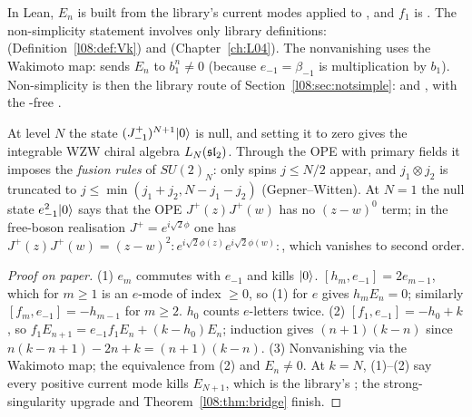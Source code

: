 \begin{dictionary}
In Lean, $E_n$ is built from the library's current modes  applied to
, and $f_1$ is . The non-simplicity statement involves only library definitions:
 (Definition~\ref{l08:def:Vk}) and  (Chapter~\ref{ch:L04}). The
nonvanishing uses the Wakimoto map:  sends $E_n$ to $b_1^n\ne0$ (because
$e_{-1} = \beta_{-1}$ is multiplication by $b_1$). Non-simplicity is then the library route of
Section~\ref{l08:sec:notsimple}: \allowbreak{}\allowbreak{}\allowbreak{} and
\allowbreak{}\allowbreak{}\allowbreak{}\allowbreak{}\allowbreak{}, with the -free \allowbreak{}\allowbreak{}\allowbreak{}\allowbreak{}.
\end{dictionary}

\begin{physics}
At level $N$ the state $(J^+_{-1})^{N+1}|0\rangle$ is null, and setting it to zero gives the
integrable WZW chiral algebra $L_N(\mathfrak{sl}_2)$. Through the OPE with primary fields it imposes the
\emph{fusion rules} of $SU(2)_N$: only spins $j\le N/2$ appear, and $j_1\otimes j_2$ is truncated to
$j\le\min(j_1+j_2,N-j_1-j_2)$ (Gepner--Witten). At $N=1$ the null state $e_{-1}^2|0\rangle$ says that
the OPE $J^+(z)J^+(w)$ has no $(z-w)^0$ term; in the free-boson realisation $J^+ = e^{i\sqrt2\phi}$ one has
$J^+(z)J^+(w) = (z-w)^2{:}e^{i\sqrt2\phi(z)}e^{i\sqrt2\phi(w)}{:}$, which vanishes to second order.
\end{physics}

\begin{proof}[Proof on paper]
(1) $e_m$ commutes with $e_{-1}$ and kills $|0\rangle$. $[h_m,e_{-1}] = 2e_{m-1}$, which for $m\ge1$ is an
$e$-mode of index $\ge0$, so (1) for $e$ gives $h_mE_n=0$; similarly $[f_m,e_{-1}] = -h_{m-1}$ for
$m\ge2$. $h_0$ counts $e$-letters twice.
(2) $[f_1,e_{-1}] = -h_0 + k$, so $f_1E_{n+1} = e_{-1}f_1E_n + (k - h_0)E_n$; induction gives
$(n+1)(k-n)$ since $n(k-n+1) - 2n + k = (n+1)(k-n)$.
(3) Nonvanishing via the Wakimoto map; the equivalence from (2) and $E_n\ne0$.
At $k=N$, (1)--(2) say every positive current mode kills $E_{N+1}$, which is the library's
; the strong-singularity upgrade and Theorem~\ref{l08:thm:bridge} finish.
\end{proof}

